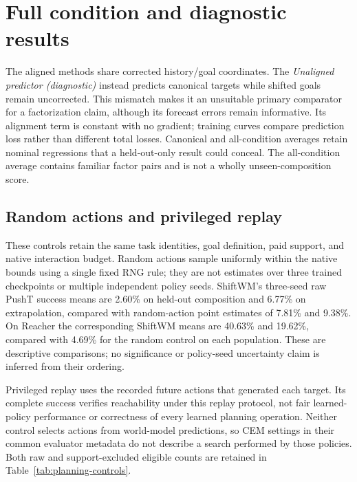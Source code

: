 \FloatBarrier
\section{Full condition and diagnostic results}
\label{sec:full-results}
The aligned methods share corrected history/goal coordinates. The
\emph{Unaligned predictor (diagnostic)} instead predicts canonical targets
while shifted goals remain uncorrected. This mismatch makes it an unsuitable
primary comparator for a factorization claim, although its forecast errors
remain informative. Its alignment term is constant with no gradient;
training curves compare prediction loss rather than different total losses.
Canonical and all-condition averages retain nominal regressions that a
held-out-only result could conceal. The all-condition average contains
familiar factor pairs and is not a wholly unseen-composition score.

\FloatBarrier
\subsection{Random actions and privileged replay}
\label{sec:planning-controls}
These controls retain the same task identities, goal definition, paid support,
and native interaction budget. Random actions sample uniformly within the
native bounds using a single fixed RNG rule; they are not estimates over
three trained checkpoints or multiple independent policy seeds. ShiftWM's
three-seed raw PushT success means are 2.60\% on held-out composition and
6.77\% on extrapolation, compared with random-action point estimates of
7.81\% and 9.38\%. On Reacher the corresponding ShiftWM means are 40.63\%
and 19.62\%, compared with 4.69\% for the random control on each population.
These are descriptive comparisons; no significance or policy-seed uncertainty
claim is inferred from their ordering.

Privileged replay uses the recorded future actions that generated each target.
Its complete success verifies reachability under this replay protocol, not
fair learned-policy performance or correctness of every learned planning
operation. Neither control selects actions from world-model predictions, so
CEM settings in their common evaluator metadata do not describe a search
performed by those policies. Both raw and support-excluded eligible counts
are retained in Table~\ref{tab:planning-controls}.

